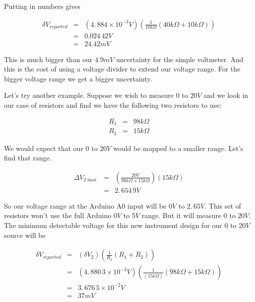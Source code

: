 \noindent Putting in numbers gives 

\begin{eqnarray*}
	\delta V_{reported} &=&\left( 4.\,\allowbreak 884\times 10^{-3}\unit{V} \right) \left( \frac{1}{10\unit{k\Omega}}\left( 40\unit{k\Omega}+10\unit{k\Omega}\right) \right) \\
                        &=&0.024\,42\unit{V} \\
                        &=&24.42\unit{mV}
\end{eqnarray*}

This is much bigger than our $4.9\unit{mV}$ uncertainty for the simple voltmeter. And this is the cost of using a voltage divider to extend our voltage range. For the bigger voltage range we get a bigger uncertainty.

Let's try another example. Suppose we wish to measure $0$ to $20\unit{V}$ and we look in our case of resistors and find we have the following two resistors to use:

\begin{eqnarray*}
	R_{1} &=&98\unit{k\Omega} \\
	R_{2} &=&15\unit{k\Omega}
\end{eqnarray*}

We would expect that our $0$ to $20\unit{V}$ would be mapped to a smaller range. Let's find that range.

\begin{eqnarray*}
	\Delta V_{2\max } &=&\left( \frac{20\unit{V}}{98\unit{k\Omega}+15\unit{k\Omega}}\right) \left( 15\unit{k\Omega}\right) \\
                      &=&2.\,\allowbreak 654\,9\unit{V}
\end{eqnarray*}

So our voltage range at the Arduino A0 input will be $0\unit{V}$ to $ 2.\,\allowbreak 65\unit{V}.$ This set of resistors won't use the full Arduino $0\unit{V}$ to $5\unit{V}$ range. But it will measure $0$ to $20 \unit{V}.$ The minimum detectable voltage for this new instrument design for
our $0$ to $20\unit{V}$ source will be 

\begin{eqnarray*}
	\delta V_{reported} &=&\left( \delta V_{2}\right) \left( \frac{1}{R_{2}}\left( R_{1}+R_{2}\right) \right) \\
                       &=&\left( 4.\,\allowbreak 880\,3\times 10^{-3}\unit{V}\right) \left( \frac{1}{\left( 15\unit{k\Omega}\right) }\left( 98\unit{k\Omega}+15\unit{k\Omega}\right) \right) \\
                       &=&3.\,\allowbreak 676\,5\times 10^{-2}\unit{V} \\
                       &=&37\unit{mV}
\end{eqnarray*}

